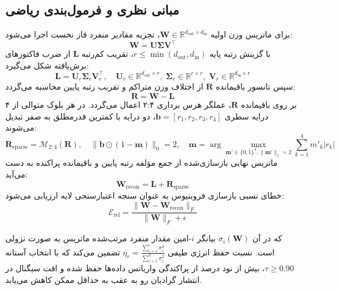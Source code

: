\subsection{مبانی نظری و فرمول‌بندی ریاضی}
برای ماتریس وزن اولیه $\mathbf{W} \in \mathbb{R}^{d_{\text{out}} \times d_{\text{in}}}$، تجزیه مقادیر منفرد فاز نخست اجرا می‌شود:
\begin{equation}
\mathbf{W} = \mathbf{U} \mathbf{\Sigma} \mathbf{V}^\top
\end{equation}
با گزینش رتبه پایه $r \le \min(d_{\text{out}}, d_{\text{in}})$، تقریب کم‌رتبه $\mathbf{L}$ از ضرب فاکتورهای برش‌یافته شکل می‌گیرد:
\begin{equation}
\mathbf{L} = \mathbf{U}_r \mathbf{\Sigma}_r \mathbf{V}_r^\top, \quad \mathbf{U}_r \in \mathbb{R}^{d_{\text{out}} \times r}, \; \mathbf{\Sigma}_r \in \mathbb{R}^{r \times r}, \; \mathbf{V}_r \in \mathbb{R}^{d_{\text{in}} \times r}
\end{equation}
سپس تانسور باقیمانده $\mathbf{R}$ از اختلاف وزن متراکم و تقریب رتبه پایین محاسبه می‌گردد:
\begin{equation}
\mathbf{R} = \mathbf{W} - \mathbf{L}
\end{equation}
بر روی باقیمانده $\mathbf{R}$، عملگر هرس برداری ۲:۴ اعمال می‌گردد. در هر بلوک متوالی از ۴ درایه سطری $\mathbf{b} = [r_1, r_2, r_3, r_4]$، دو درایه با کمترین قدرمطلق به صفر تبدیل می‌شوند:
\begin{equation}
\mathbf{R}_{\text{sparse}} = \mathcal{M}_{2:4}(\mathbf{R}), \quad \|\mathbf{b} \odot (1 - \mathbf{m})\|_0 = 2, \quad \mathbf{m} = \arg\max_{\mathbf{m}' \in \{0, 1\}^4, \|\mathbf{m}'\|_1=2} \sum_{k=1}^4 m'_k |r_k|
\end{equation}
ماتریس نهایی بازسازی‌شده از جمع مؤلفه رتبه پایین و باقیمانده پراکنده به دست می‌آید:
\begin{equation}
\mathbf{W}_{\text{recon}} = \mathbf{L} + \mathbf{R}_{\text{sparse}}
\end{equation}
خطای نسبی بازسازی فروبنیوس به عنوان سنجه اعتبارسنجی لایه ارزیابی می‌شود:
\begin{equation}
\mathcal{E}_{\text{rel}} = \frac{\|\mathbf{W} - \mathbf{W}_{\text{recon}}\|_F}{\|\mathbf{W}\|_F + \epsilon}
\end{equation}

که در آن $\sigma_i(\mathbf{W})$ بیانگر $i$-امین مقدار منفرد مرتب‌شده ماتریس به صورت نزولی است. نسبت حفظ انرژی طیفی $\eta_r = \frac{\sum_{i=1}^r \sigma_i^2}{\sum_{i=1}^{d} \sigma_i^2}$ تضمین می‌کند که با انتخاب آستانه $\tau \ge 0.90$، بیش از نود درصد از پراکندگی واریانس داده‌ها حفظ شده و افت سیگنال در انتشار گرادیان رو به عقب به حداقل ممکن کاهش می‌یابد.

